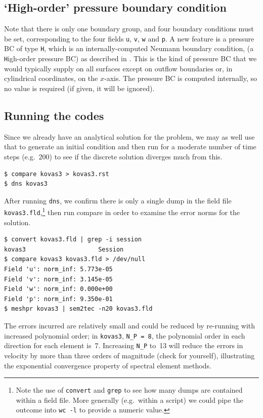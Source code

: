 \documentclass[11pt]{report}
\newcommand{\eg}{e.g.\ } \newcommand{\CC}{\mathrm{c.c.}}
\begin{document}
\subsection{`High-order' pressure boundary condition}

Note that there is only one boundary group, and four boundary
conditions must be set, corresponding to the four fields \verb+u+,
\verb+v+, \verb+w+ and \verb+p+.  A new feature is a pressure BC of
type \verb+H+, which is an internally-computed Neumann boundary
condition, (a \verb+H+igh-order pressure BC) as described in
\citet{kio91}.  This is the kind of pressure BC that we would
typically supply on all surfaces except on outflow boundaries or, in
cylindrical coordinates, on the $x$-axis.  The pressure BC is computed
internally, so no value is required (if given, it will be ignored).

\subsection{Running the codes}

Since we already have an analytical solution for the problem, we may
as well use that to generate an initial condition and then run for a
moderate number of time steps (\eg 200) to see if the discrete
solution diverges much from this.
{\small
\begin{verbatim}
$ compare kovas3 > kovas3.rst
$ dns kovas3
\end{verbatim}
}

After running \verb+dns+, we confirm there is only a single dump in
the field file \verb+kovas3.fld+,\footnote{Note the use of
  \texttt{convert} and \texttt{grep} to see how many dumps are
  contained within a field file.  More generally (\eg within a script)
  we could pipe the outcome into \texttt{wc -l} to provide a numeric
  value.}  then run compare in order to examine the error norms for
the solution.
%
{\small
\begin{verbatim}
$ convert kovas3.fld | grep -i session
kovas3                    Session
$ compare kovas3 kovas3.fld > /dev/null
Field 'u': norm_inf: 5.773e-05
Field 'v': norm_inf: 3.145e-05
Field 'w': norm_inf: 0.000e+00
Field 'p': norm_inf: 9.350e-01
$ meshpr kovas3 | sem2tec -n20 kovas3.fld
\end{verbatim}
}
%
The errors incurred are relatively small and could be reduced by
re-running with increased polynomial order; in \verb|kovas3|,
\verb|N_P = 8|, \ie the polynomial order in each direction for each
element is~7.  Increasing \verb|N_P| to~13 will reduce the errors in
velocity by more than three orders of magnitude (check for yourself),
illustrating the exponential convergence property of spectral element
methods.
\end{document}
